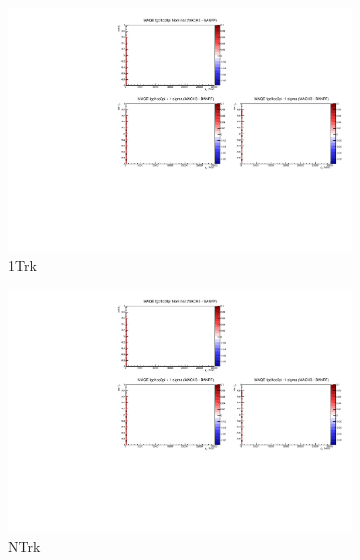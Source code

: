\begin{figure}[h]
	\begin{subfigure}[t]{0.24\textwidth}
		\includegraphics[width=\textwidth, trim={5mm 70mm 100mm 7mm}, clip, page=11]{figures/mach3/banff/momentumProjections_170328_withMACH3_MAQEonly}
		\caption{1Trk}
	\end{subfigure}
	\begin{subfigure}[t]{0.24\textwidth}
		\includegraphics[width=\textwidth, trim={5mm 70mm 100mm 7mm}, clip, page=12]{figures/mach3/banff/momentumProjections_170328_withMACH3_MAQEonly}
		\caption{NTrk}
	\end{subfigure}
	\begin{subfigure}[t]{0.24\textwidth}

\end{subfigure}
\end{figure}
